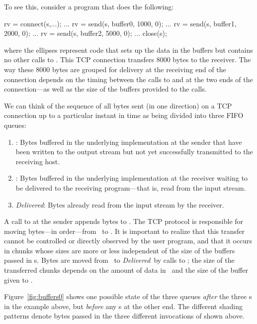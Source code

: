 To see this,
consider a program that does the following:
%
\begin{inlinecode}
rv = connect(s,...);
...
rv = send(s, buffer0, 1000, 0);
...
rv = send(s, buffer1, 2000, 0);
...
rv = send(s, buffer2, 5000, 0);
...
close(s);

\end{inlinecode}
%
where the ellipses represent code that sets up the data in the
buffers but contains no other calls to .
%
This TCP connection transfers 8000 bytes to the receiver.  The way
these 8000 bytes are grouped for delivery at the receiving end of the
connection depends on the timing between the calls to
 and
 at the two ends of the
connection---as well as the size of the buffers provided to the
 calls.

We can think of the sequence of all bytes sent (in one direction) on a
TCP connection up to a particular instant in time as being divided into three
FIFO queues:

\begin{enumerate}

\item \emph{\sque}: Bytes buffered in the underlying implementation at
the sender that have been written to the output stream but not yet
successfully transmitted to the receiving host.

\item \emph{\rque}: Bytes buffered in the underlying implementation at
the receiver waiting to be delivered to the receiving program---that
is, read from the input stream.

\item \emph{Delivered}: Bytes already read from the input stream by
the receiver.

\end{enumerate}
%
A call to  at the sender
appends bytes to \sque.  The TCP protocol is responsible for
moving bytes---in order---from \sque\ to \rque.  It is
important to realize that this transfer cannot be controlled or
directly observed by the user program, and that it occurs in chunks
whose sizes are more or less independent of the size of the buffers
passed in s.  Bytes are moved from
\rque\ to \emph{Delivered}\ by calls to ;
the size of the transferred chunks depends on the amount of
data in \rque\ and the size of the buffer given to
.

Figure~\ref{fig:buffers0} shows one possible state of the three queues
\emph{after} the three s in
the example above, but \emph{before} any
s at the other end.  The
different shading patterns denote bytes passed in the three different
invocations of  shown above.


